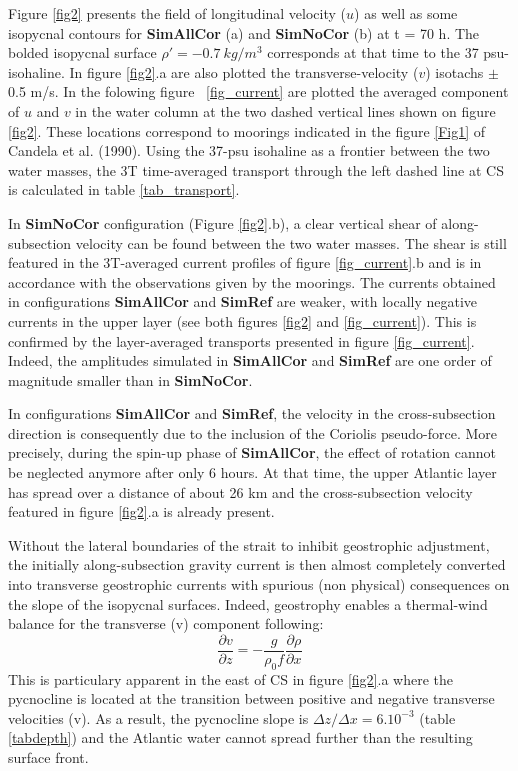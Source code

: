 Figure \ref{fig2} presents the field of longitudinal velocity ($u$) as well as some isopycnal contours for \textbf{SimAllCor} (a) and \textbf{SimNoCor} (b) at t = 70 h. The bolded isopycnal surface $\rho'= -0.7\ kg/m^3$ corresponds at that time to the 37 psu-isohaline. In figure \ref{fig2}.a are also plotted the transverse-velocity ($v$) isotachs $\pm$ 0.5 m/s. In the folowing figure \ \ref{fig_current} are plotted the averaged component of $u$ and $v$ in the water column at the two dashed vertical lines shown on figure \ref{fig2}. These locations correspond to moorings indicated in the figure \ref{Fig1} of Candela et al. (1990). Using the 37-psu isohaline as a frontier between the two water masses, the 3T time-averaged transport through the left dashed line at CS is calculated in table \ref{tab_transport}.

In \textbf{SimNoCor} configuration (Figure \ref{fig2}.b), a clear vertical shear of along-subsection velocity can be found between the two water masses. The shear is still featured in the 3T-averaged current profiles of figure \ref{fig_current}.b and is in accordance with the observations given by the moorings. The currents obtained in configurations \textbf{SimAllCor} and \textbf{SimRef} are weaker, with locally negative currents in the upper layer (see both figures \ref{fig2} and \ref{fig_current}). This is confirmed by the layer-averaged transports presented in figure \ref{fig_current}. Indeed, the amplitudes simulated in \textbf{SimAllCor} and \textbf{SimRef} are one order of magnitude smaller than in \textbf{SimNoCor}. 
 
In configurations \textbf{SimAllCor} and \textbf{SimRef}, the velocity in the cross-subsection direction is consequently due to the inclusion of the Coriolis pseudo-force. More precisely, during the spin-up phase of \textbf{SimAllCor}, the effect of rotation cannot be neglected anymore after only 6 hours. At that time, the upper Atlantic layer has spread over a distance of about 26 km and the cross-subsection velocity featured in figure \ref{fig2}.a is already present.

Without the lateral boundaries of the strait to inhibit geostrophic adjustment, the initially along-subsection gravity current is then almost completely converted into transverse geostrophic currents with spurious (non physical) consequences on the slope of the isopycnal surfaces. Indeed, geostrophy enables a thermal-wind balance for the transverse (v) component following: 
\begin{equation}  
    \label{Thermal_wind}
    \displaystyle   
	\frac{\partial v}{\partial z}
    =-\frac{g}{\rho_0 f} \frac{\partial \rho}{\partial x}
\end{equation}
This is particulary apparent in the east of CS in figure \ref{fig2}.a where the pycnocline is located at the transition between positive and negative transverse velocities (v). As a result, the pycnocline slope is $\Delta z/\Delta x = 6.10^{-3}$ (table \ref{tabdepth}) and the Atlantic water cannot spread further than the resulting surface front.

